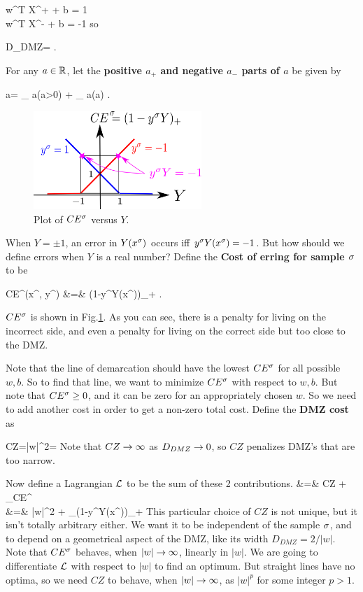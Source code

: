 \beqa
w^T X^+ + b = 1
\\
w^T X^- + b = -1
\eeqa
so

\beq
D_{DMZ}= 
\;.
\eeq

For any $a\in { \mathbb{R}}$, let 
the {\bf positive $a_+$ 
and negative $a_-$
parts of $a$} be
given by

\beq
a= 
_
{ a\indi(a>0)} 
+ 
_
{ a\indi(a)}
\;.
\eeq
\begin{figure}[h!]
\centering
\includegraphics[width=2.5in]
{svm/svm-hinge.png}
\caption{Plot of $CE^\sigma$ versus $Y$.} 
\label{fig-svm-hinge}
\end{figure}

When $Y=\pm 1$,
an  error in $Y(x^\sigma)$  occurs iff $y^\sigma Y(x^\sigma)=-1$.
But how should we define
errors when $Y$ is a real number?
Define the {\bf Cost of erring for sample $\sigma$} to be

\beqa
CE^\s(x^\s, y^\s)
&=&
(1-y^\s Y(x^\s))_+
\;.
\eeqa

$CE^\sigma$ is shown in Fig.\ref{fig-svm-hinge}.
As you can see, 
there is a penalty for living on the
incorrect side, 
and even a penalty for living on the 
correct side but too close to the DMZ.

Note that the line of demarcation
should have the lowest $CE^\sigma$
for all possible $w, b$. So to find
that line,
we want to minimize  $CE^\sigma$
with respect to $w, b$.
But note that $CE^\sigma\geq 0$, 
and it can be zero for an appropriately
chosen $w$. So we need to add another 
cost in order to get a non-zero total cost.
Define the {\bf DMZ cost} as 

\beq
CZ=|w|^2=
\eeq
Note that $CZ\rightarrow \infty$
as $D_{DMZ}\rightarrow 0$,
so $CZ$ penalizes DMZ's that are too narrow.

Now define a Lagrangian ${\cal L}$
to be the sum 
of these 2 contributions.
\beqa
\call&=& CZ + \sum_\s CE^\s
\\
&=&
  |w|^2 + \sum_\s (1-y^\s Y(x^\s))_+
\eeqa
This particular choice of $CZ$
is not unique, but it isn't totally arbitrary either. 
We want it to be independent of the sample $\sigma$,
and to depend on a geometrical aspect of the DMZ,
 like its width $D_{DMZ}=2/|w|$.
Note that $CE^\sigma$ behaves, when $|w|\rightarrow \infty$,
 linearly in $|w|$.
We are going to differentiate ${\cal L}$ with 
respect to $|w|$
to find an optimum.
But straight lines have no optima, so we need
$CZ$ to behave, when $|w|\rightarrow \infty$,
  as $|w|^p$ for some 
integer $p>1$.



